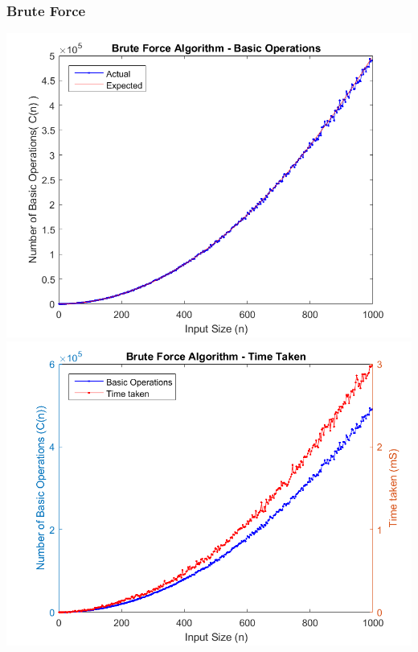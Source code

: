 \documentclass{article}
\begin{document}
        \subsubsection{Brute Force}
            \includegraphics[scale=0.6]{Images/brute_algorithm_basic_operations.png}\\
            \includegraphics[scale=0.6]{Images/brute_algorithm_time_taken.png}
\end{document}
